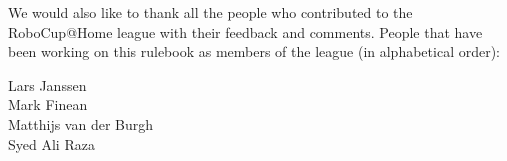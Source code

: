 \noindent We would also like to thank all the people who contributed to the RoboCup@Home league with their feedback and comments.
People that have been working on this rulebook as members of the league (in alphabetical order):
\begin{center}
	\begin{minipage}{0.8\textwidth}
		\begin{multicols}{2}%
			\footnotesize
			\noindent%
			Lars Janssen\\
			Mark Finean\\
			Matthijs van der Burgh\\
			Syed Ali Raza\\
		\end{multicols}
	\end{minipage}
\end{center}


